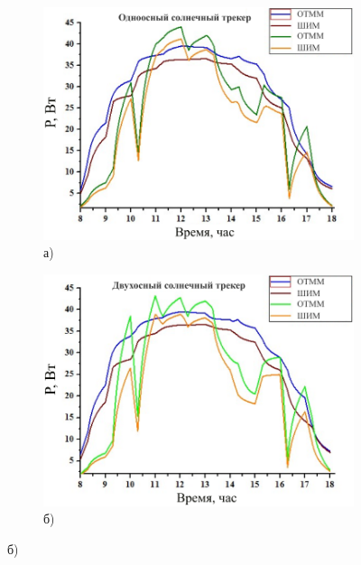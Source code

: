 \begin{figure}[H]
    \centering
    \begin{subfigure}[b]{0.45\textwidth}
        \centering
        \includegraphics[width=\textwidth]{media/ict/image13}
        \caption*{а)}
    \end{subfigure}
    \hfill
    \begin{subfigure}[b]{0.45\textwidth}
        \centering
        \includegraphics[width=\textwidth]{media/ict/image14}
        \caption*{б)}
    \end{subfigure}

    \par\bigskip


\end{figure}
